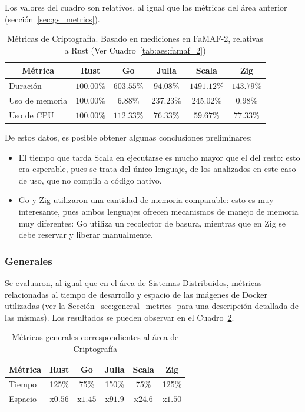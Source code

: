 \documentclass[11pt]{article}
\let\Oldsubsubsection\subsubsection
\renewcommand{\subsubsection}{\FloatBarrier\Oldsubsubsection}
\begin{document}
Los valores del cuadro son relativos, al igual que las métricas del área anterior (sección~\ref{sec:gs_metrics}).

\begin{table}[h]
\centering
\begin{tabular}{|l|c|c|c|c|c|}
\hline
\multicolumn{1}{|c|}{Métrica} & Rust & Go & Julia & Scala & Zig \\ \hline
Duración & $100.00\%$& $603.55\%$& $94.08\%$& $1491.12\%$& $143.79\%$\\ \hline
Uso de memoria & $100.00\%$& $6.88\%$& $237.23\%$& $245.02\%$& $0.98\%$\\ \hline
Uso de CPU & $100.00\%$& $112.33\%$& $76.33\%$& $59.67\%$& $77.33\%$\\ \hline
\end{tabular}
\caption{Métricas de Criptografía. Basado en mediciones en FaMAF-2, relativas a Rust  (Ver Cuadro~\ref{tab:aes:famaf_2})}
\label{tab:aes:metrics}
\end{table}

De estos datos, es posible obtener algunas conclusiones preliminares:

\begin{itemize}
    \item El tiempo que tarda Scala en ejecutarse es mucho mayor que el del resto: esto era esperable, pues se trata del único lenguaje, de los analizados en este caso de uso, que no compila a código nativo.
    \item Go y Zig utilizaron una cantidad de memoria comparable: esto es muy interesante, pues ambos lenguajes ofrecen mecanismos de manejo de memoria muy diferentes: Go utiliza un recolector de basura, mientras que en Zig se debe reservar y liberar manualmente.
\end{itemize}

\subsubsection{Generales}

Se evaluaron, al igual que en el área de Sistemas Distribuidos, métricas relacionadas al tiempo de desarrollo y espacio de las imágenes de Docker utilizadas (ver la Sección~\ref{sec:general_metrics} para una descripción detallada de las mismas). Los resultados se pueden observar en el Cuadro~\ref{tab:aes:relative_general_metrics}.

\begin{table}[h]
\centering
\begin{tabular}{|l|c|c|c|c|c|}
\hline
\multicolumn{1}{|c|}{Métrica} & Rust & Go & Julia & Scala & Zig \\ \hline
Tiempo & 125\% & 75\% & 150\% & 75\% & 125\% \\ \hline
Espacio & x$0.56$ & x$1.45$ & x$91.9$ & x$24.6$ & x$1.50$ \\ \hline
\end{tabular}
\caption{Métricas generales correspondientes al área de Criptografía}
\label{tab:aes:relative_general_metrics}
\end{table}
\end{document}
